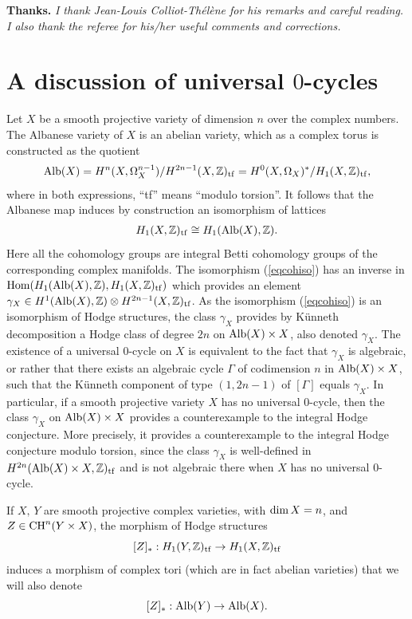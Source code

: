 \documentclass[10pt]{article}
\begin{document}
{\bf Thanks.} {\it I thank Jean-Louis Colliot-Thélène for his remarks and careful reading. I also thank the referee for his/her  useful comments and corrections.}


\section{A discussion of universal $0$-cycles \label{sec1}}

Let $X$ be a smooth projective variety of dimension $n$ over the complex numbers. The Albanese variety of $X$ is an abelian variety, which as a complex torus is constructed as the quotient $${\rm Alb}(X)=H^{n}(X,\Omega_X^{n-1})/H^{2n-1}(X,\mathbb{Z})_{\rm tf}=H^{0}(X,\Omega_X)^*/H_1(X,\mathbb{Z})_{\rm tf},$$
where in both expressions, ``tf'' means ``modulo torsion''.
It follows that the Albanese map induces by construction an isomorphism of lattices
\begin{eqnarray}\label{eqcohiso} H_1(X,\mathbb{Z})_{\rm tf}\cong H_1({\rm Alb}(X),\mathbb{Z}).
\end{eqnarray}
Here all the cohomology groups are integral Betti cohomology groups of the corresponding complex manifolds.
The isomorphism (\ref{eqcohiso}) has an inverse in ${\rm Hom}(H_1({\rm Alb}(X),\mathbb{Z}),H_1(X,\mathbb{Z})_{\rm tf}) $ which provides an element $\gamma_X\in H^1({\rm Alb}(X),\mathbb{Z})\otimes H^{2n-1}(X,\mathbb{Z})_{\rm tf}$.
As the isomorphism (\ref{eqcohiso}) is an isomorphism of Hodge structures, the class $\gamma_X$ provides by K\"{u}nneth decomposition  a Hodge class of degree $2n$ on ${\rm Alb}(X)\times X$, also denoted $\gamma_X$. The existence of a universal $0$-cycle on $X$ is equivalent to the fact that $\gamma_X$ is algebraic, or rather that there exists an algebraic cycle $\Gamma$ of codimension $n$ in ${\rm Alb}(X)\times X$, such that the K\"{u}nneth component of type $(1,2n-1)$ of $[\Gamma]$ equals $\gamma_X$. In particular, if a smooth projective variety $X$ has no universal $0$-cycle, then the class $\gamma_X$ on  ${\rm Alb}(X)\times X$  provides a counterexample to the integral Hodge conjecture. More precisely, it provides a counterexample to the integral  Hodge conjecture modulo torsion, since the class $\gamma_X$ is well-defined in $H^{2n}({\rm Alb}(X)\times X,\mathbb{Z})_{\rm tf}$ and is not algebraic there when $X$ has no universal $0$-cycle.

If $X,\,Y$ are smooth projective complex varieties, with ${\rm dim}\,X=n$, and $Z\in{\rm CH}^n(Y\times X)$, the morphism of Hodge structures
$$[Z]_*: H_1(Y,\mathbb{Z})_{\rm tf}\rightarrow H_1(X,\mathbb{Z})_{\rm tf}$$
induces a morphism of complex tori (which are in fact abelian varieties) that we will also denote
$$[Z]_*:{\rm Alb}(Y)\rightarrow {\rm Alb}(X).$$
\end{document}
